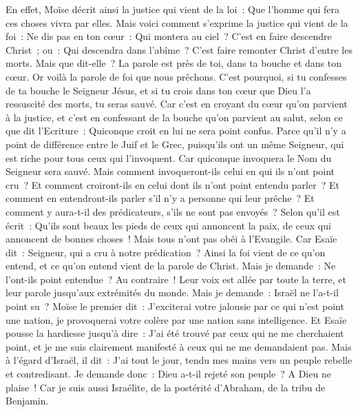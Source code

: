 \begin{multicols}{2}
En effet, Moïse décrit ainsi la justice qui vient de la loi~: Que l'homme qui fera ces choses vivra par elles.
Mais voici comment s'exprime la justice qui vient de la foi~: Ne dis pas en ton cœur~: Qui montera au ciel~? C'est en faire descendre Christ~;
ou~: Qui descendra dans l'abîme~? C'est faire remonter Christ d'entre les morts.
Mais que dit-elle~? La parole est près de toi, dans ta bouche et dans ton cœur. Or voilà la parole de foi que nous prêchons.
C'est pourquoi, si tu confesses de ta bouche le Seigneur Jésus, et si tu crois dans ton cœur que Dieu l'a ressuscité des morts, tu seras sauvé.
Car c'est en croyant du cœur qu'on parvient à la justice, et c'est en confessant de la bouche qu'on parvient au salut, selon ce que dit l'Ecriture~:
Quiconque croit en lui ne sera point confus.
Parce qu'il n'y a point de différence entre le Juif et le Grec, puisqu'ils ont un même Seigneur, qui est riche pour tous ceux qui l'invoquent.
Car quiconque invoquera le Nom du Seigneur sera sauvé.
Mais comment invoqueront-ils celui en qui ils n'ont point cru~? Et comment croiront-ils en celui dont ils n'ont point entendu parler~? Et comment en entendront-ils parler s'il n'y a personne qui leur prêche~?
Et comment y aura-t-il des prédicateurs, s'ils ne sont pas envoyés~? Selon qu'il est écrit~: Qu'ils sont beaux les pieds de ceux qui annoncent la paix, de ceux qui annoncent de bonnes choses~!
Mais tous n'ont pas obéi à l'Evangile. Car Esaïe dit~: Seigneur, qui a cru à notre prédication~?
Ainsi la foi vient de ce qu'on entend, et ce qu'on entend vient de la parole de Christ.
Mais je demande~: Ne l'ont-ils point entendue~? Au contraire~! Leur voix est allée par toute la terre, et leur parole jusqu'aux extrémités du monde.
Mais je demande~: Israël ne l'a-t-il point su~? Moïse le premier dit~: J'exciterai votre jalousie par ce qui n'est point une nation, je provoquerai votre colère par une nation sans intelligence.
Et Esaïe pousse la hardiesse jusqu'à dire~: J'ai été trouvé par ceux qui ne me cherchaient point, et je me suis clairement manifesté à ceux qui ne me demandaient pas.
Mais à l'égard d'Israël, il dit~: J'ai tout le jour, tendu mes mains vers un peuple rebelle et contredisant.
\VerseOne{}Je demande donc~: Dieu a-t-il rejeté son peuple~? A Dieu ne plaise~! Car je suis aussi Israélite, de la postérité d'Abraham, de la tribu de Benjamin.

\end{multicols}
